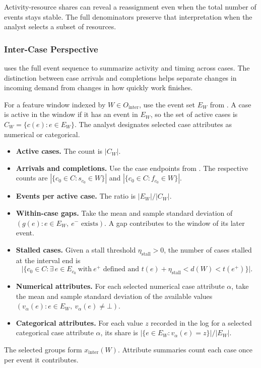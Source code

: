 Activity-resource shares can reveal a reassignment even when the total number of events stays stable. The full denominators preserve that interpretation when the analyst selects a subset of resources.

\subsubsection{Inter-Case Perspective}

 uses the full event sequence to summarize activity and timing across cases. The distinction between case arrivals and completions helps separate changes in incoming demand from changes in how quickly work finishes.

\begin{Definition}\label{def:inter-features}
For a feature window indexed by $W\in O_{\mathrm{inter}}$, use the event set $E_W$ from . A case is active in the window if it has an event in $E_W$, so the set of active cases is $C_W=\{c(e):e\in E_W\}$. The analyst designates selected case attributes as numerical or categorical.
\begin{itemize}
  \item \textbf{Active cases.} The count is $|C_W|$.
  \item \textbf{Arrivals and completions.} Use the case endpoints from . The respective counts are $|\{c_0\in C:s_{c_0}\in W\}|$ and $|\{c_0\in C:f_{c_0}\in W\}|$.
  \item \textbf{Events per active case.} The ratio is $|E_W|/|C_W|$.
  \item \textbf{Within-case gaps.} Take the mean and sample standard deviation of $(g(e):e\in E_W,\ e^-\text{ exists})$. A gap contributes to the window of its later event.
  \item \textbf{Stalled cases.} Given a stall threshold $\eta_{\mathrm{stall}}>0$, the number of cases stalled at the interval end is
  \[
     \bigl|\{c_0\in C:\exists\,e\in E_{c_0}\ \text{with}\ e^+\text{ defined and }
                 t(e)+\eta_{\mathrm{stall}}<d(W)<t(e^+)\}\bigr|.
  \]
  \item \textbf{Numerical attributes.} For each selected numerical case attribute $\alpha$, take the mean and sample standard deviation of the available values $(v_\alpha(e):e\in E_W,\ v_\alpha(e)\ne\bot)$.
  \item \textbf{Categorical attributes.} For each value $z$ recorded in the log for a selected categorical case attribute $\alpha$, its share is $|\{e\in E_W:v_\alpha(e)=z\}|/|E_W|$.
\end{itemize}
The selected groups form $x_{\mathrm{inter}}(W)$. Attribute summaries count each case once per event it contributes.
\end{Definition}

